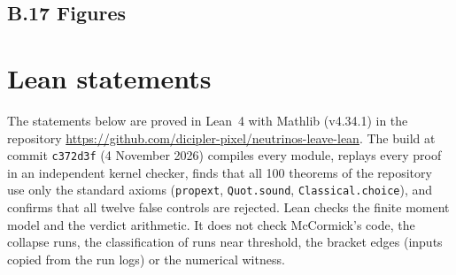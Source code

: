 \documentclass[11pt]{article}
\begin{document}
\subsection*{B.17 Figures}





\section{Lean statements}
\sloppy
The statements below are proved in Lean~4 with Mathlib (v4.34.1) in the repository \url{https://github.com/dicipler-pixel/neutrinos-leave-lean}. The build at commit \texttt{c372d3f} (4 November 2026) compiles every module, replays every proof in an independent kernel checker, finds that all 100 theorems of the repository use only the standard axioms (\texttt{propext}, \texttt{Quot.sound}, \texttt{Classical.choice}), and confirms that all twelve false controls are rejected. Lean checks the finite moment model and the verdict arithmetic. It does not check McCormick's code, the collapse runs, the classification of runs near threshold, the bracket edges (inputs copied from the run logs) or the numerical witness.
\end{document}
